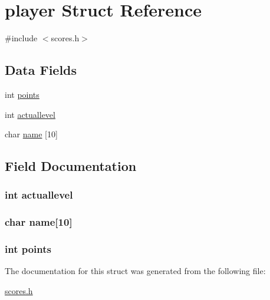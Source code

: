 \hypertarget{structplayer}{\section{player Struct Reference}
\label{structplayer}
}


{\ttfamily \#include $<$scores.\-h$>$}

\subsection*{Data Fields}
\begin{DoxyCompactItemize}
\item 
int \hyperlink{structplayer_af7f8f4a4e39e09fdb5e9f02330ecabef}{points}
\item 
int \hyperlink{structplayer_a9f91a8332047469738a3eb3ec4126d09}{actuallevel}
\item 
char \hyperlink{structplayer_a38db771080a5bca533de0f0236ff11ec}{name} \mbox{[}10\mbox{]}
\end{DoxyCompactItemize}


\subsection{Field Documentation}
\hypertarget{structplayer_a9f91a8332047469738a3eb3ec4126d09}{
\subsubsection[{actuallevel}]{\setlength{\rightskip}{0pt plus 5cm}int actuallevel}}\label{structplayer_a9f91a8332047469738a3eb3ec4126d09}
\hypertarget{structplayer_a38db771080a5bca533de0f0236ff11ec}{
\subsubsection[{name}]{\setlength{\rightskip}{0pt plus 5cm}char name\mbox{[}10\mbox{]}}}\label{structplayer_a38db771080a5bca533de0f0236ff11ec}
\hypertarget{structplayer_af7f8f4a4e39e09fdb5e9f02330ecabef}{
\subsubsection[{points}]{\setlength{\rightskip}{0pt plus 5cm}int points}}\label{structplayer_af7f8f4a4e39e09fdb5e9f02330ecabef}


The documentation for this struct was generated from the following file\-:\begin{DoxyCompactItemize}
\item 
\hyperlink{scores_8h}{scores.\-h}\end{DoxyCompactItemize}
